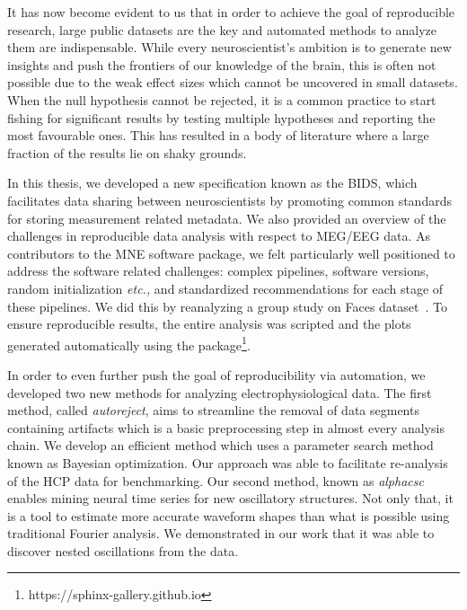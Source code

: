 It has now become evident to us that in order to achieve the goal of reproducible research, large public datasets are the key and automated methods to analyze them are indispensable. While every neuroscientist's ambition is to generate new insights and push the frontiers of our knowledge of the brain, this is often not possible due to the weak effect sizes which cannot be uncovered in small datasets. When the null hypothesis cannot be rejected, it is a common practice to start fishing for significant results by testing multiple hypotheses and reporting the most favourable ones. This has resulted in a body of literature where a large fraction of the results lie on shaky grounds. 

In this thesis, we developed a new specification known as the \ac{BIDS}, which facilitates data sharing between neuroscientists by promoting common standards for storing measurement related metadata. We also provided an overview of the challenges in reproducible data analysis with respect to \ac{MEG}/\ac{EEG} data. As contributors to the MNE software package, we felt particularly well positioned to address  the software related challenges: complex pipelines, software versions, random initialization \emph{etc.,} and standardized recommendations for each stage of these pipelines. We did this by reanalyzing a group study on Faces dataset~\citep{wakeman2015multi}. To ensure reproducible results, the entire analysis was scripted and the plots generated automatically using the  package\footnote{https://sphinx-gallery.github.io}.

In order to even further push the goal of reproducibility via automation, we developed two new methods for analyzing electrophysiological data. The first method, called \emph{autoreject}, aims to streamline the removal of data segments containing artifacts which is a basic preprocessing step in almost every analysis chain. We develop an efficient method which uses a parameter search method known as Bayesian optimization. Our approach was able to facilitate re-analysis of the \ac{HCP} data for benchmarking. Our second method, known as \emph{alphacsc} enables mining neural time series for new oscillatory structures. Not only that, it is a tool to estimate more accurate waveform shapes than what is possible using traditional Fourier analysis. We demonstrated in our work that it was able to discover nested oscillations from the data.

